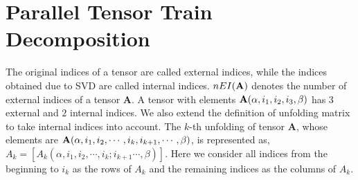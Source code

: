 \documentclass[runningheads]{llncs}
\newcommand{\tensor}[1]{{\cal\textbf{#1}\xspace}}
\begin{document}
\section{Parallel Tensor Train Decomposition}
\label{sec:tt_parallel}
The original indices of a tensor are called external indices, while the indices obtained due to SVD are called internal indices. $nEI(\tensor{A})$ denotes the number of external indices of a tensor \tensor{A}. A tensor with elements $\tensor{A}(\alpha, i_1, i_2, i_3, \beta)$ has $3$ external and $2$ internal indices. We also extend the definition of unfolding matrix to take internal indices into account. The $k$-th unfolding of tensor \tensor{A}, whose elements are $\tensor{A}(\alpha, i_1, i_2, \cdots,i_k, i_{k+1}, \cdots, \beta)$, is represented as, $ A_k = [A_k(\alpha, i_1, i_2, \cdots, i_k; i_{k+1}\cdots, \beta)]$. Here we consider all indices from the beginning to $i_{k}$ as the rows of $A_k$ and the remaining indices as the columns of $A_k$.
\end{document}
